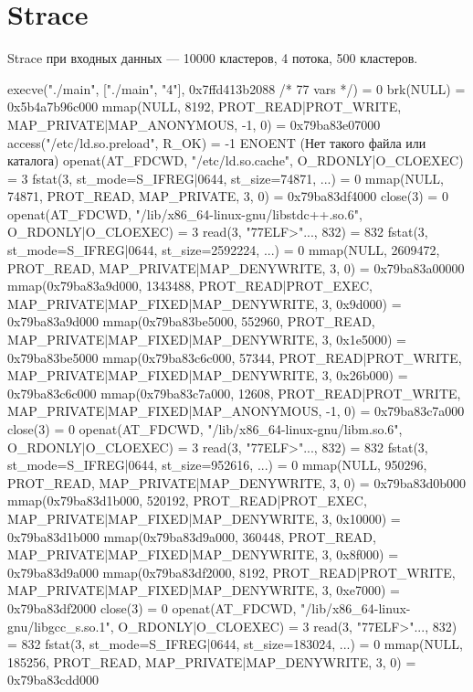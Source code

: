 \section{Strace}
Strace при входных данных --- 10000 кластеров, 4 потока, 500 кластеров. 
\begin{breakableverbatim}
execve("./main", ["./main", "4"], 0x7ffd413b2088 /* 77 vars */) = 0
brk(NULL)                               = 0x5b4a7b96c000
mmap(NULL, 8192, PROT_READ|PROT_WRITE, MAP_PRIVATE|MAP_ANONYMOUS, -1, 0) = 0x79ba83e07000
access("/etc/ld.so.preload", R_OK)      = -1 ENOENT (Нет такого файла или каталога)
openat(AT_FDCWD, "/etc/ld.so.cache", O_RDONLY|O_CLOEXEC) = 3
fstat(3, {st_mode=S_IFREG|0644, st_size=74871, ...}) = 0
mmap(NULL, 74871, PROT_READ, MAP_PRIVATE, 3, 0) = 0x79ba83df4000
close(3)                                = 0
openat(AT_FDCWD, "/lib/x86_64-linux-gnu/libstdc++.so.6", O_RDONLY|O_CLOEXEC) = 3
read(3, "\177ELF\2\1\1\3\0\0\0\0\0\0\0\0\3\0>\0\1\0\0\0\0\0\0\0\0\0\0\0"..., 832) = 832
fstat(3, {st_mode=S_IFREG|0644, st_size=2592224, ...}) = 0
mmap(NULL, 2609472, PROT_READ, MAP_PRIVATE|MAP_DENYWRITE, 3, 0) = 0x79ba83a00000
mmap(0x79ba83a9d000, 1343488, PROT_READ|PROT_EXEC, MAP_PRIVATE|MAP_FIXED|MAP_DENYWRITE, 3, 0x9d000) = 0x79ba83a9d000
mmap(0x79ba83be5000, 552960, PROT_READ, MAP_PRIVATE|MAP_FIXED|MAP_DENYWRITE, 3, 0x1e5000) = 0x79ba83be5000
mmap(0x79ba83c6c000, 57344, PROT_READ|PROT_WRITE, MAP_PRIVATE|MAP_FIXED|MAP_DENYWRITE, 3, 0x26b000) = 0x79ba83c6c000
mmap(0x79ba83c7a000, 12608, PROT_READ|PROT_WRITE, MAP_PRIVATE|MAP_FIXED|MAP_ANONYMOUS, -1, 0) = 0x79ba83c7a000
close(3)                                = 0
openat(AT_FDCWD, "/lib/x86_64-linux-gnu/libm.so.6", O_RDONLY|O_CLOEXEC) = 3
read(3, "\177ELF\2\1\1\3\0\0\0\0\0\0\0\0\3\0>\0\1\0\0\0\0\0\0\0\0\0\0\0"..., 832) = 832
fstat(3, {st_mode=S_IFREG|0644, st_size=952616, ...}) = 0
mmap(NULL, 950296, PROT_READ, MAP_PRIVATE|MAP_DENYWRITE, 3, 0) = 0x79ba83d0b000
mmap(0x79ba83d1b000, 520192, PROT_READ|PROT_EXEC, MAP_PRIVATE|MAP_FIXED|MAP_DENYWRITE, 3, 0x10000) = 0x79ba83d1b000
mmap(0x79ba83d9a000, 360448, PROT_READ, MAP_PRIVATE|MAP_FIXED|MAP_DENYWRITE, 3, 0x8f000) = 0x79ba83d9a000
mmap(0x79ba83df2000, 8192, PROT_READ|PROT_WRITE, MAP_PRIVATE|MAP_FIXED|MAP_DENYWRITE, 3, 0xe7000) = 0x79ba83df2000
close(3)                                = 0
openat(AT_FDCWD, "/lib/x86_64-linux-gnu/libgcc_s.so.1", O_RDONLY|O_CLOEXEC) = 3
read(3, "\177ELF\2\1\1\0\0\0\0\0\0\0\0\0\3\0>\0\1\0\0\0\0\0\0\0\0\0\0\0"..., 832) = 832
fstat(3, {st_mode=S_IFREG|0644, st_size=183024, ...}) = 0
mmap(NULL, 185256, PROT_READ, MAP_PRIVATE|MAP_DENYWRITE, 3, 0) = 0x79ba83cdd000

\end{breakableverbatim}
